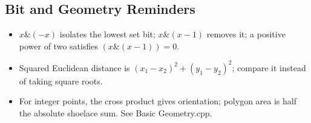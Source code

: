 \subsection{Bit and Geometry Reminders}
\begin{itemize}
  \setlength{\itemsep}{0.2ex}
  \setlength{\topsep}{0.3ex}
  \setlength{\parsep}{0pt}
  \setlength{\partopsep}{0pt}
  \item $x\&(-x)$ isolates the lowest set bit; $x\&(x-1)$ removes it; a positive power of two satisfies $(x\&(x-1))=0$.
  \item Squared Euclidean distance is $(x_1-x_2)^2+(y_1-y_2)^2$; compare it instead of taking square roots.
  \item For integer points, the cross product gives orientation; polygon area is half the absolute shoelace sum. See Basic Geometry.cpp.
\end{itemize}
